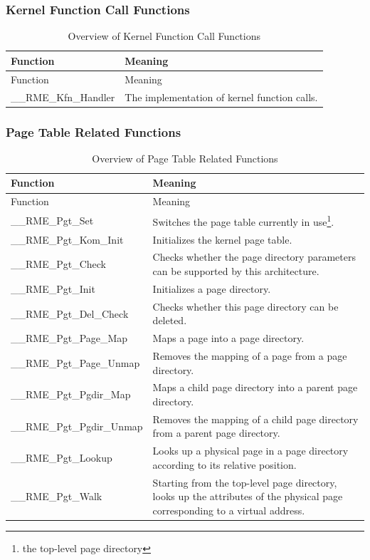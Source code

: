 \subsubsection{Kernel Function Call Functions}\label{subsubsec:7-kernel-function-call-functions}

\begin{xltabular}{\textwidth}{@{}>{\hsize\raggedright\arraybackslash}X>{\hsize\raggedright\arraybackslash}X@{}}
\caption{Overview of Kernel Function Call Functions}\label{tab:7-13-kernel-function-call-functions-overview}\\
\toprule
Function & Meaning\tabularnewline
\endfirsthead
\toprule
Function & Meaning\tabularnewline
\midrule
\endhead
\bottomrule
\endlastfoot
\_\_RME\_Kfn\_Handler & The implementation of kernel function calls.\tabularnewline
\end{xltabular}
\nopagebreak[4]

\subsubsection{Page Table Related Functions}\label{subsubsec:7-page-table-functions}
\nopagebreak[4]

\begin{xltabular}{\textwidth}{@{}>{\hsize\raggedright\arraybackslash}X>{\hsize\raggedright\arraybackslash}X@{}}
\caption{Overview of Page Table Related Functions}\label{tab:7-14-page-table-functions-overview}\\
\toprule
Function & Meaning\tabularnewline
\endfirsthead
\toprule
Function & Meaning\tabularnewline
\midrule
\endhead
\bottomrule
\endlastfoot
\_\_RME\_Pgt\_Set &
Switches the page table currently in use\footnote{the top-level page directory}.\tabularnewline
\_\_RME\_Pgt\_Kom\_Init & Initializes the kernel page table.\tabularnewline
\_\_RME\_Pgt\_Check & Checks whether the page directory parameters can be supported by this architecture.\tabularnewline
\_\_RME\_Pgt\_Init & Initializes a page directory.\tabularnewline
\_\_RME\_Pgt\_Del\_Check & Checks whether this page directory can be deleted.\tabularnewline
\_\_RME\_Pgt\_Page\_Map & Maps a page into a page directory.\tabularnewline
\_\_RME\_Pgt\_Page\_Unmap & Removes the mapping of a page from a page directory.\tabularnewline
\_\_RME\_Pgt\_Pgdir\_Map &
Maps a child page directory into a parent page directory.\tabularnewline
\_\_RME\_Pgt\_Pgdir\_Unmap &
Removes the mapping of a child page directory from a parent page directory.\tabularnewline
\_\_RME\_Pgt\_Lookup &
Looks up a physical page in a page directory according to its relative position.\tabularnewline
\_\_RME\_Pgt\_Walk &
Starting from the top-level page directory, looks up the attributes of the physical page corresponding to a virtual address.\tabularnewline
\end{xltabular}
\nopagebreak[4]

